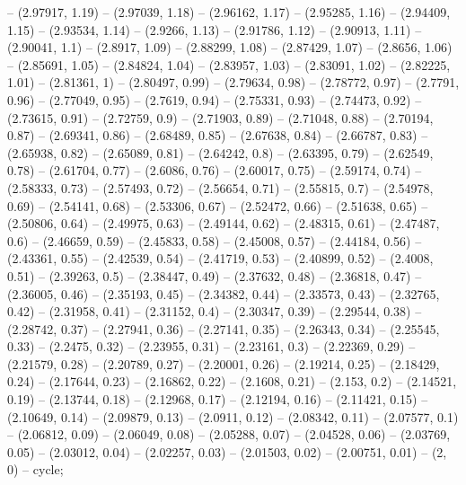 -- (2.97917, 1.19)
-- (2.97039, 1.18)
-- (2.96162, 1.17)
-- (2.95285, 1.16)
-- (2.94409, 1.15)
-- (2.93534, 1.14)
-- (2.9266, 1.13)
-- (2.91786, 1.12)
-- (2.90913, 1.11)
-- (2.90041, 1.1)
-- (2.8917, 1.09)
-- (2.88299, 1.08)
-- (2.87429, 1.07)
-- (2.8656, 1.06)
-- (2.85691, 1.05)
-- (2.84824, 1.04)
-- (2.83957, 1.03)
-- (2.83091, 1.02)
-- (2.82225, 1.01)
-- (2.81361, 1)
-- (2.80497, 0.99)
-- (2.79634, 0.98)
-- (2.78772, 0.97)
-- (2.7791, 0.96)
-- (2.77049, 0.95)
-- (2.7619, 0.94)
-- (2.75331, 0.93)
-- (2.74473, 0.92)
-- (2.73615, 0.91)
-- (2.72759, 0.9)
-- (2.71903, 0.89)
-- (2.71048, 0.88)
-- (2.70194, 0.87)
-- (2.69341, 0.86)
-- (2.68489, 0.85)
-- (2.67638, 0.84)
-- (2.66787, 0.83)
-- (2.65938, 0.82)
-- (2.65089, 0.81)
-- (2.64242, 0.8)
-- (2.63395, 0.79)
-- (2.62549, 0.78)
-- (2.61704, 0.77)
-- (2.6086, 0.76)
-- (2.60017, 0.75)
-- (2.59174, 0.74)
-- (2.58333, 0.73)
-- (2.57493, 0.72)
-- (2.56654, 0.71)
-- (2.55815, 0.7)
-- (2.54978, 0.69)
-- (2.54141, 0.68)
-- (2.53306, 0.67)
-- (2.52472, 0.66)
-- (2.51638, 0.65)
-- (2.50806, 0.64)
-- (2.49975, 0.63)
-- (2.49144, 0.62)
-- (2.48315, 0.61)
-- (2.47487, 0.6)
-- (2.46659, 0.59)
-- (2.45833, 0.58)
-- (2.45008, 0.57)
-- (2.44184, 0.56)
-- (2.43361, 0.55)
-- (2.42539, 0.54)
-- (2.41719, 0.53)
-- (2.40899, 0.52)
-- (2.4008, 0.51)
-- (2.39263, 0.5)
-- (2.38447, 0.49)
-- (2.37632, 0.48)
-- (2.36818, 0.47)
-- (2.36005, 0.46)
-- (2.35193, 0.45)
-- (2.34382, 0.44)
-- (2.33573, 0.43)
-- (2.32765, 0.42)
-- (2.31958, 0.41)
-- (2.31152, 0.4)
-- (2.30347, 0.39)
-- (2.29544, 0.38)
-- (2.28742, 0.37)
-- (2.27941, 0.36)
-- (2.27141, 0.35)
-- (2.26343, 0.34)
-- (2.25545, 0.33)
-- (2.2475, 0.32)
-- (2.23955, 0.31)
-- (2.23161, 0.3)
-- (2.22369, 0.29)
-- (2.21579, 0.28)
-- (2.20789, 0.27)
-- (2.20001, 0.26)
-- (2.19214, 0.25)
-- (2.18429, 0.24)
-- (2.17644, 0.23)
-- (2.16862, 0.22)
-- (2.1608, 0.21)
-- (2.153, 0.2)
-- (2.14521, 0.19)
-- (2.13744, 0.18)
-- (2.12968, 0.17)
-- (2.12194, 0.16)
-- (2.11421, 0.15)
-- (2.10649, 0.14)
-- (2.09879, 0.13)
-- (2.0911, 0.12)
-- (2.08342, 0.11)
-- (2.07577, 0.1)
-- (2.06812, 0.09)
-- (2.06049, 0.08)
-- (2.05288, 0.07)
-- (2.04528, 0.06)
-- (2.03769, 0.05)
-- (2.03012, 0.04)
-- (2.02257, 0.03)
-- (2.01503, 0.02)
-- (2.00751, 0.01)
-- (2, 0)
-- cycle;

